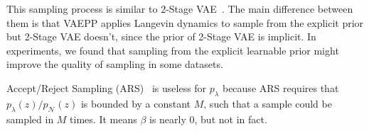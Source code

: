 This sampling process is similar to 2-Stage VAE~\cite{dai2019diagnosing}. The main difference between them is that VAEPP applies Langevin dynamics to sample from the explicit prior but 2-Stage VAE doesn't, since the prior of 2-Stage VAE is implicit. In experiments, we found that sampling from the explicit learnable prior might improve the quality of sampling in some datasets. 

Accept/Reject Sampling (ARS)~\cite{bauer2019resampled} is useless for $p_\lambda$ because ARS requires that $p_\lambda(z) / p_\mathcal{N}(z)$ is bounded by a constant $M$, such that a sample could be sampled in $M$ times. It means $\beta$ is nearly 0, but not in fact.
 
 